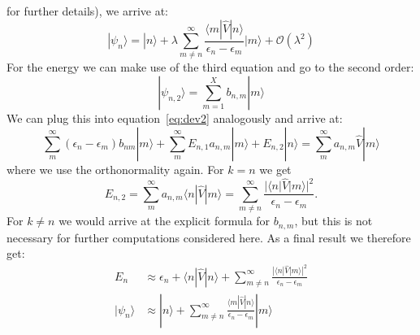 for further details), we arrive
at:
\begin{equation}
    |\psi_{n}\rangle = |n\rangle + \lambda \sum_{m\neq n}^{\infty}
    \frac{\langle m |\hat{V}|n \rangle}{\epsilon_n - \epsilon_m}  
    |m \rangle  + \mathcal{O}(\lambda^2)
\end{equation}
For the energy we can make use of the third equation and go to
the second order:
\begin{equation}
|\psi_{n,2}\rangle  = \sum_{m=1}^{X} b_{n,m} |m \rangle 
\end{equation}
We can plug this into equation~\eqref{eq:dev2} analogously and
arrive at:
\begin{equation}
 \sum_{m}^{\infty} (\epsilon_n - \epsilon_m) b_{nm} |m\rangle +
 \sum_{m}^{\infty} E_{n,1} a_{n,m} |m \rangle + E_{n,2} |n \rangle =
 \sum_{m}^{\infty} a_{n,m} \hat{V} |m \rangle
\end{equation}
where we use the orthonormality again. For $k=n$ we get 
\begin{equation}
    E_{n,2} = \sum_{m}^{\infty} a_{n,m} \langle n |\hat{V}|m\rangle
= \sum_{m\neq n}^{\infty}\frac{|\langle n | \hat{V} | m \rangle |^2}
    {\epsilon_n - \epsilon_m}.
\end{equation}
For $k\neq n$ we would arrive at the explicit formula for $b_{n,m}$,
but this is not necessary for further computations considered here.
As a final result we therefore get:
\begin{align}
    E_n &\approx \epsilon_n + \langle n|\hat{V} | n \rangle +
\sum_{m\neq n}^{\infty}\frac{|\langle n | \hat{V} | m \rangle |^2}
    {\epsilon_n - \epsilon_m} \\
    |\psi_n \rangle &\approx 
    |n\rangle + \sum_{m\neq n}^{\infty}
    \frac{\langle m |\hat{V}|n \rangle}{\epsilon_n - \epsilon_m}  
    |m \rangle 
\end{align}


